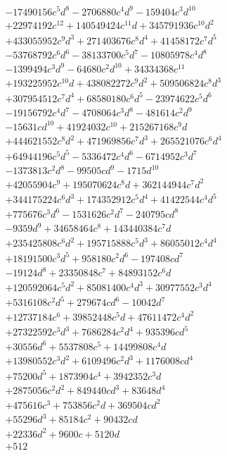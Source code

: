 {\begin{align*}
&-17490156c^{5}d^{8}-2706880c^{4}d^{9}-159404c^{3}d^{10}\\
&+22974192c^{12}+140549424c^{11}d+345791936c^{10}d^{2}\\
&+433055952c^{9}d^{3}+271403676c^{8}d^{4}+41458172c^{7}d^{5}\\
&-53768792c^{6}d^{6}-38133700c^{5}d^{7}-10805978c^{4}d^{8}\\
&-1399494c^{3}d^{9}-64680c^{2}d^{10}+34334368c^{11}\\
&+193225952c^{10}d+438082272c^{9}d^{2}+509506824c^{8}d^{3}\\
&+307954512c^{7}d^{4}+68580180c^{6}d^{5}-23974622c^{5}d^{6}\\
&-19156792c^{4}d^{7}-4708064c^{3}d^{8}-481614c^{2}d^{9}\\
&-15631cd^{10}+41924032c^{10}+215267168c^{9}d\\
&+444621552c^{8}d^{2}+471969856c^{7}d^{3}+265521076c^{6}d^{4}\\
&+64944196c^{5}d^{5}-5336472c^{4}d^{6}-6714952c^{3}d^{7}\\
&-1373813c^{2}d^{8}-99505cd^{9}-1715d^{10}\\
&+42055904c^{9}+195070624c^{8}d+362144944c^{7}d^{2}\\
&+344175224c^{6}d^{3}+174352912c^{5}d^{4}+41422544c^{4}d^{5}\\
&+775676c^{3}d^{6}-1531626c^{2}d^{7}-240795cd^{8}\\
&-9359d^{9}+34658464c^{8}+143440384c^{7}d\\
&+235425808c^{6}d^{2}+195715888c^{5}d^{3}+86055012c^{4}d^{4}\\
&+18191500c^{3}d^{5}+958180c^{2}d^{6}-197408cd^{7}\\
&-19124d^{8}+23350848c^{7}+84893152c^{6}d\\
&+120592064c^{5}d^{2}+85081400c^{4}d^{3}+30977552c^{3}d^{4}\\
&+5316108c^{2}d^{5}+279674cd^{6}-10042d^{7}\\
&+12737184c^{6}+39852448c^{5}d+47611472c^{4}d^{2}\\
&+27322592c^{3}d^{3}+7686284c^{2}d^{4}+935396cd^{5}\\
&+30556d^{6}+5537808c^{5}+14499808c^{4}d\\
&+13980552c^{3}d^{2}+6109496c^{2}d^{3}+1176008cd^{4}\\
&+75200d^{5}+1873904c^{4}+3942352c^{3}d\\
&+2875056c^{2}d^{2}+849440cd^{3}+83648d^{4}\\
&+475616c^{3}+753856c^{2}d+369504cd^{2}\\
&+55296d^{3}+85184c^{2}+90432cd\\
&+22336d^{2}+9600c+5120d\\
&+512
\end{align*}
}


